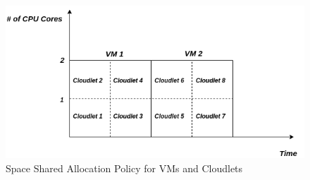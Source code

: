 \documentclass[12pt]{article}
\begin{document}
\begin{figure}[ht!]
\centering
\includegraphics[scale=0.5]{space_vm_space_cloudlet.png}
\caption{Space Shared Allocation Policy for VMs and Cloudlets}
\end{figure}




\newpage


\end{document}
